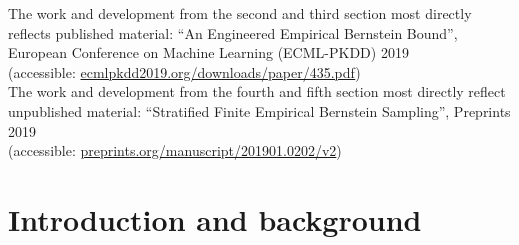 The work and development from the second and third section most directly reflects published material: ``An Engineered Empirical Bernstein Bound'',\\ European Conference on Machine Learning (ECML-PKDD) 2019\\(accessible: \href{http://ecmlpkdd2019.org/downloads/paper/435.pdf}{ecmlpkdd2019.org/downloads/paper/435.pdf})\\
The work and development from the fourth and fifth section most directly reflect unpublished material: ``Stratified Finite Empirical Bernstein Sampling'', Preprints 2019\\
(accessible: \href{preprints.org/manuscript/201901.0202/v2}{preprints.org/manuscript/201901.0202/v2})\\







\section{Introduction and background}\label{sec:sampling_background}


